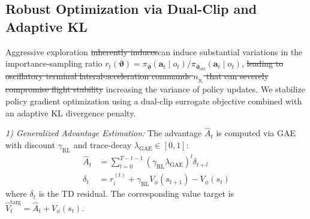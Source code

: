 \documentclass[lettersize,journal]{IEEEtran}
\newcommand{\hladd}[1]{{\color{blue}#1}}
\newcommand{\hldel}[1]{{\color{red}\sout{#1}}}
\begin{document}
\subsection{Robust Optimization via Dual-Clip and Adaptive KL}
\label{subsec:dual_clip_kl}

Aggressive exploration
\hldel{inherently induces}\hladd{can induce}
substantial variations in the importance-sampling ratio
$r_t(\boldsymbol{\vartheta}) =
\pi_{\boldsymbol{\vartheta}}(\mathbf{a}_t \mid o_t) /
\pi_{\boldsymbol{\vartheta}_{\mathrm{old}}}(\mathbf{a}_t \mid o_t)$,
\hldel{leading to oscillatory terminal lateral-acceleration commands
$n_{y_i}$ that can severely compromise flight stability}
\hladd{increasing the variance of policy updates}.
We stabilize policy gradient optimization using a dual-clip surrogate
objective combined with an adaptive KL divergence penalty.


\emph{1) Generalized Advantage Estimation:} The advantage $\hat{A}_t$ is computed via GAE with discount $\gamma_{\mathrm{RL}}$ and trace-decay $\lambda_{\mathrm{GAE}} \in [0,1]$:
\begin{align}
\hat{A}_t &= \sum_{l=0}^{T-t-1} (\gamma_{\mathrm{RL}}\lambda_{\mathrm{GAE}})^l \delta_{t+l} \label{eq:gae_A} \\
\delta_t &= r_i^{(t)} + \gamma_{\mathrm{RL}} V_\phi(s_{t+1}) - V_\phi(s_t) \label{eq:gae_delta}
\end{align}
where $\delta_t$ is the TD residual. The corresponding value target is $\hat{V}_t^{\mathrm{targ}} = \hat{A}_t + V_\phi(s_t)$.
\end{document}
